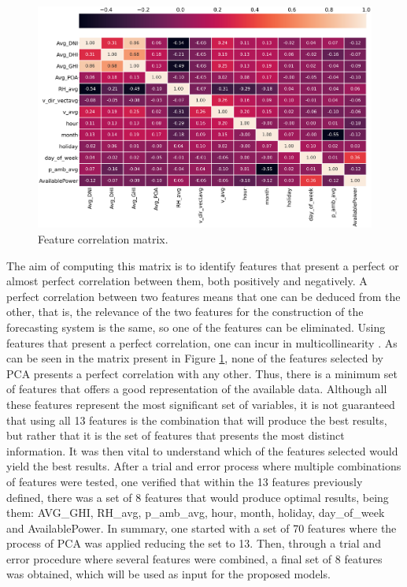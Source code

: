 \begin{figure}[h!]
    \centering
    \begin{center}
    \includegraphics[width=1\textwidth]{Images/corr1.PNG}
    \caption{Feature correlation matrix.}
    \label{corr}
    \end{center}
\end{figure}


The aim of computing this matrix is to identify features that present a perfect or almost perfect correlation between them, both positively and negatively. A perfect correlation between two features means that one can be deduced from the other, that is, the relevance of the two features for the construction of the forecasting system is the same, so one of the features can be eliminated. Using features that present a perfect correlation, one can incur in multicollinearity \cite{multicollinearity}. As can be seen in the matrix present in Figure \ref{corr}, none of the features selected by \ac{PCA} presents a perfect correlation with any other. Thus, there is a minimum set of features that offers a good representation of the available data. Although all these features represent the most significant set of variables, it is not guaranteed that using all 13 features is the combination that will produce the best results, but rather that it is the set of features that presents the most distinct information. It was then vital to understand which of the features selected would yield the best results. After a trial and error process where multiple combinations of features were tested, one verified that within the 13 features previously defined, there was a set of 8 features that would produce optimal results, being them: AVG\_GHI, RH\_avg, p\_amb\_avg, hour, month, holiday, day\_of\_week and AvailablePower. 
In summary, one started with a set of 70 features where the process of \ac{PCA} was applied reducing the set to 13. Then, through a trial and error procedure where several features were combined, a final set of 8 features was obtained, which will be used as input for the proposed models.



